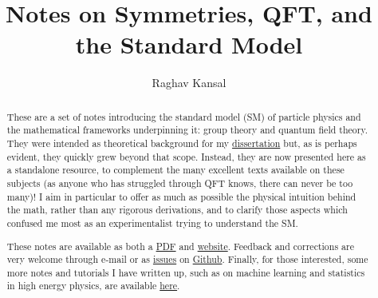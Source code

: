 \documentclass[12pt]{report}
\title{Notes on Symmetries, QFT, and the Standard Model}
\author{Raghav Kansal}
\theoremstyle{definition}
\theoremstyle{definition}
\theoremstyle{definition}
\numberwithin{equation}{chapter}
\begin{document}

\maketitle

\begin{abstract}
\begin{doublespace}
\setlength{\parskip}{\baselineskip}
These are a set of notes introducing the standard model (SM) of particle physics and the mathematical frameworks underpinning it: group theory and quantum field theory.
They were intended as theoretical background for my \href{https://www.raghavkansal.com}{dissertation} but, as is perhaps evident, they quickly grew beyond that scope.
Instead, they are now presented here as a standalone resource, to complement the many excellent texts available on these subjects (as anyone who has struggled through QFT knows, there can never be too many)!
I aim in particular to offer as much as possible the physical intuition behind the math, rather than any rigorous derivations, and to clarify those aspects which confused me most as an experimentalist trying to understand the SM.

These notes are available as both a \href{https://github.com/rkansal47/standard-model/blob/gh-pages/standard-model.pdf?raw=true}{PDF} and \href{https://rkansal47.github.io/standard-model}{website}.
Feedback and corrections are very welcome through e-mail or as \href{https://github.com/rkansal47/standard-model/issues}{issues} on \href{https://github.com/rkansal47/standard-model/}{Github}.
Finally, for those interested, some more notes and tutorials I have written up, such as on machine learning and statistics in high energy physics, are available \href{https://www.raghavkansal.com/teaching/}{here}.
\end{doublespace}
\end{abstract}


{
\hypersetup{linkcolor=black}
\tableofcontents
}

\setlength{\parskip}{\baselineskip}

\begin{doublespace}




\end{doublespace}

\nocite{apsrev42Control}

\end{document}
